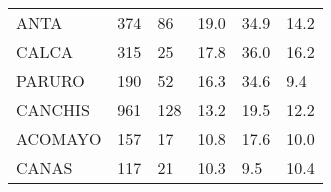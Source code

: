 \begin{tabular}{llllll}
	\cellcolor[HTML]{F8CBAD}ANTA                                   & 374                                                                   & 86                                                               & 19.0                                                                             & 34.9                                                                        & 14.2                                                                                \\
	\cellcolor[HTML]{F8CBAD}CALCA                                  & 315                                                                   & 25                                                               & 17.8                                                                             & 36.0                                                                        & 16.2                                                                                \\
	\cellcolor[HTML]{FFFF99}PARURO                                 & 190                                                                   & 52                                                               & 16.3                                                                             & 34.6                                                                        & 9.4                                                                                 \\
	\cellcolor[HTML]{FFFF99}CANCHIS                                & 961                                                                   & 128                                                              & 13.2                                                                             & 19.5                                                                        & 12.2                                                                                \\
	\cellcolor[HTML]{FFFF99}ACOMAYO                                & 157                                                                   & 17                                                               & 10.8                                                                             & 17.6                                                                        & 10.0                                                                                \\
	\cellcolor[HTML]{FFFF99}CANAS                                  & 117                                                                   & 21                                                               & 10.3                                                                             & 9.5                                                                         & 10.4                                                                                \\

\end{tabular}
